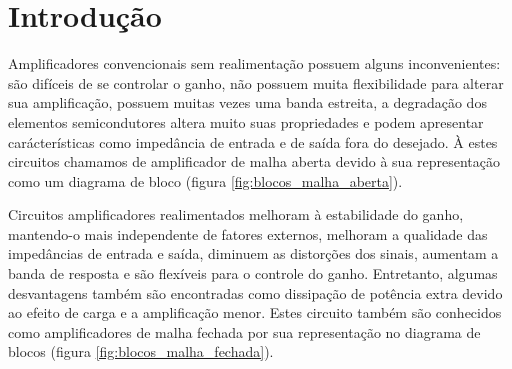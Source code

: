 \documentclass[openright]{normas-utf-tex} %
\begin{document}
\capa %
\folhaderosto %

\sumario %
\listoffigures
\listoftables

%
%
%
%


\chapter{Introdução}
\label{intro}

Amplificadores convencionais sem realimentação possuem alguns inconvenientes: são difíceis de se controlar o ganho, não possuem muita flexibilidade para alterar sua amplificação, possuem muitas vezes uma banda estreita, a degradação dos elementos semicondutores altera muito suas propriedades e podem apresentar carácterísticas como impedância de entrada e de saída fora do desejado. À estes circuitos chamamos de amplificador de malha aberta devido à sua representação como um diagrama de bloco (figura \ref{fig:blocos_malha_aberta}). \cite{pedroni,millman} 

Circuitos amplificadores realimentados melhoram à estabilidade do ganho, mantendo-o mais independente de fatores externos, melhoram a qualidade das impedâncias de entrada e saída, diminuem as distorções dos sinais, aumentam a banda de resposta e são flexíveis para o controle do ganho. Entretanto, algumas desvantagens também são encontradas como dissipação de potência extra devido ao efeito de carga e a amplificação menor. Estes circuito também são conhecidos como amplificadores de malha fechada por sua representação no diagrama de blocos (figura \ref{fig:blocos_malha_fechada}). \cite{pedroni,millman} 
\end{document}
